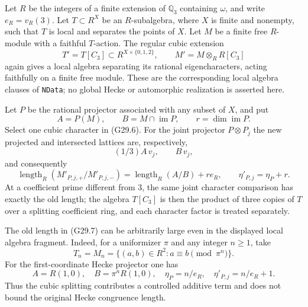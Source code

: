 \begin{proposition}
\label{AC-G29-Hecke}
Let $R$ be the integers of a finite extension of $\mathbb Q_3$
containing $\omega$, and write $e_R=v_R(3)$.
Let $T\subset R^X$ be an $R$-subalgebra, where $X$ is finite
and nonempty, such that $T$ is local and separates the points
of $X$.  Let $M$ be a finite free $R$-module with a faithful
$T$-action.  The regular cubic extension
\[
 T'=T[C_3]\subset R^{X\times\{0,1,2\}},
             \qquad M'=M\otimes_R R[C_3]               \tag{G29.6}
\]
again gives a local algebra separating its rational
eigencharacters, acting faithfully on a finite free module.
These are the corresponding local algebra clauses of
\texttt{NData}; no global Hecke or automorphic realization is
asserted here.

Let $P$ be the rational projector associated with any subset
of $X$, and put
\[
 A=P(M),\qquad B=M\cap\operatorname{im}P,
                 \qquad r=\dim\operatorname{im}P.
\]
Select one cubic character in (G29.6).  For the joint
projector $P\otimes P_j$ the new projected and intersected
lattices are, respectively,
\[
           (1/3)A\,v_j,\qquad B\,v_j,
\]
and consequently
\[
 \operatorname{length}_R(M'_{P,j,+}/M'_{P,j,-})
       =\operatorname{length}_R(A/B)+r e_R,
 \qquad \eta'_{P,j}=\eta_P+r.                          \tag{G29.7}
\]
At a coefficient prime different from $3$, the same joint
character comparison has exactly the old length; the
algebra $T[C_3]$ is then the product of three copies of $T$
over a splitting coefficient ring, and each character factor
is treated separately.

The old length in (G29.7) can be arbitrarily large even in
the displayed local algebra fragment.  Indeed, for a
uniformizer $\pi$ and any integer $n\ge1$, take
\[
 T_n=M_n=\{(a,b)\in R^2:a\equiv b\pmod{\pi^n}\}.
\]
For the first-coordinate Hecke projector one has
\[
 A=R(1,0),\quad B=\pi^nR(1,0),\quad
       \eta_P=n/e_R,\quad \eta'_{P,j}=n/e_R+1.          \tag{G29.8}
\]
Thus the cubic splitting contributes a controlled additive
term and does not bound the original Hecke congruence length.
\end{proposition}
